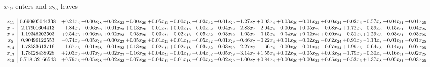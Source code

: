 \documentclass[9pt]{article}
\begin{document}
 $ x_{19} $ enters and $ x_{25} $ leaves 

 \[\begin{array}{c| c c@{\hskip 2pt} c@{\hskip 2pt} c@{\hskip 2pt} c@{\hskip 2pt} c@{\hskip 2pt} c@{\hskip 2pt} c@{\hskip 2pt} c@{\hskip 2pt} c@{\hskip 2pt} c@{\hskip 2pt} c@{\hskip 2pt} c@{\hskip 2pt} c@{\hskip 2pt} c@{\hskip 2pt} c@{\hskip 2pt} c@{\hskip 2pt} c@{\hskip 2pt} }
 x_{11}   &  0.690605044338 & +  0.21 x_{3} & -0.00 x_{28} & +  0.02 x_{23} & -0.00 x_{20} & +  0.05 x_{21} & -0.00 x_{18} & +  0.02 x_{32} & +  0.01 x_{29} & -1.27 x_{7} & +  0.03 x_{4} & +  0.03 x_{30} & -0.01 x_{22} & +  0.00 x_{24} & -0.02 x_{6} & -0.57 x_{8} & +  0.04 x_{31} & -0.01 x_{25}\\
 x_{17}   &  2.17901604413 & -1.84 x_{3} & -0.06 x_{28} & +  0.01 x_{23} & +  0.13 x_{20} & -0.01 x_{21} & +  0.00 x_{18} & +  0.00 x_{32} & -0.04 x_{29} & +  2.83 x_{7} & -2.04 x_{4} & -0.00 x_{30} & +  0.05 x_{22} & -0.08 x_{24} & +  1.72 x_{6} & -0.59 x_{8} & -0.15 x_{31} & -0.04 x_{25}\\
 x_{12}   &  1.19346202503 & +  0.54 x_{3} & +  0.06 x_{28} & +  0.02 x_{23} & -0.03 x_{20} & -0.03 x_{21} & -0.02 x_{18} & -0.05 x_{32} & +  0.03 x_{29} & +  1.05 x_{7} & -0.15 x_{4} & -0.04 x_{30} & +  0.02 x_{22} & +  0.00 x_{24} & -0.51 x_{6} & +  1.29 x_{8} & +  0.03 x_{31} & +  0.03 x_{25}\\
 x_{5}   &  0.90496122553 & -0.74 x_{3} & -0.05 x_{28} & -0.00 x_{23} & +  0.05 x_{20} & +  0.01 x_{21} & +  0.01 x_{18} & +  0.05 x_{32} & -0.01 x_{29} & -0.46 x_{7} & -0.22 x_{4} & +  0.01 x_{30} & -0.02 x_{22} & -0.02 x_{24} & +  0.91 x_{6} & -1.13 x_{8} & -0.01 x_{31} & -0.01 x_{25}\\
 x_{14}   &  1.78533613716 & -1.67 x_{3} & -0.01 x_{28} & -0.01 x_{23} & +  0.13 x_{20} & -0.02 x_{21} & +  0.02 x_{18} & -0.03 x_{32} & -0.03 x_{29} & +  2.27 x_{7} & -1.66 x_{4} & -0.00 x_{30} & -0.01 x_{22} & -0.07 x_{24} & +  1.99 x_{6} & -0.64 x_{8} & -0.14 x_{31} & -0.07 x_{25}\\
 x_{13}   &  1.78028438928 & +  2.03 x_{3} & +  0.07 x_{28} & -0.02 x_{23} & -0.16 x_{20} & +  0.04 x_{21} & -0.03 x_{18} & +  0.04 x_{32} & +  0.05 x_{29} & -3.14 x_{7} & +  1.55 x_{4} & +  0.02 x_{30} & -0.05 x_{22} & +  0.03 x_{24} & -1.79 x_{6} & -0.30 x_{8} & +  0.16 x_{31} & +  0.02 x_{25}\\
 x_{15}   &  0.718132166543 & +  0.79 x_{3} & +  0.05 x_{28} & +  0.02 x_{23} & -0.07 x_{20} & -0.04 x_{21} & -0.01 x_{18} & +  0.00 x_{32} & +  0.02 x_{29} & -1.00 x_{7} & +  0.84 x_{4} & +  0.00 x_{30} & +  0.00 x_{22} & +  0.05 x_{24} & -0.53 x_{6} & +  1.37 x_{8} & +  0.05 x_{31} & +  0.03 x_{25}\\

\end{array}\]
\end{document}

